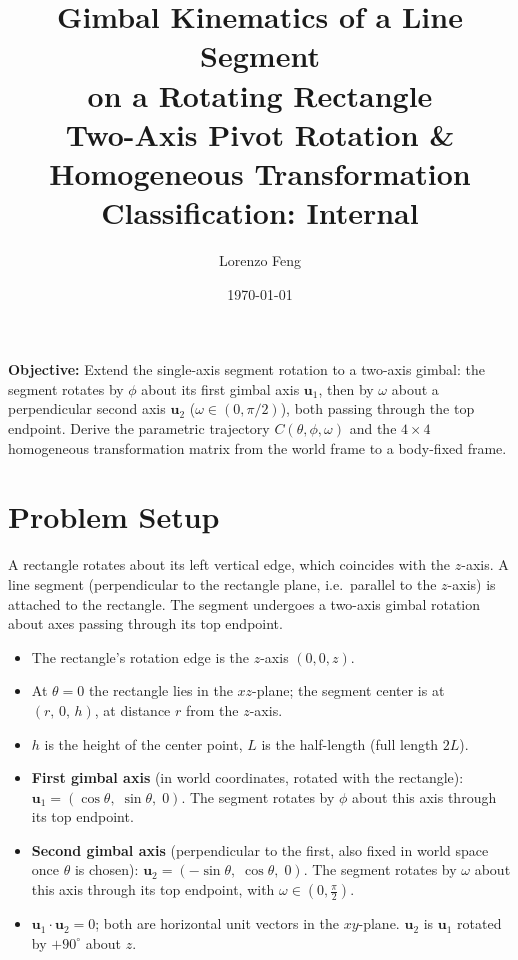 \documentclass[12pt,a4paper]{article}
\title{\Huge\textbf{Gimbal Kinematics of a Line Segment}\\[4pt]
       \Huge\textbf{on a Rotating Rectangle}\\[12pt]
       \large Two-Axis Pivot Rotation \& Homogeneous Transformation\\[8pt]
       \normalsize Classification: Internal}
\author{Lorenzo Feng}
\date{\today}
\newcommand{\uva}{\mathbf{u}_1}
\newcommand{\uvb}{\mathbf{u}_2}
\begin{document}
\maketitle

\vspace{1.5cm}

\begin{center}
\begin{minipage}{0.75\textwidth}
\large
\textbf{Objective:} Extend the single-axis segment rotation to a two-axis
gimbal: the segment rotates by $\phi$ about its first gimbal axis $\uva$, then by
$\omega$ about a perpendicular second axis $\uvb$ ($\omega\in(0,\pi/2)$),
both passing through the top endpoint.
Derive the parametric trajectory $C(\theta,\phi,\omega)$ and the $4\times4$
homogeneous transformation matrix from the world frame to a body-fixed frame.
\end{minipage}
\end{center}

\vfill

\clearpage
\tableofcontents
\clearpage

\section{Problem Setup}

A rectangle rotates about its left vertical edge, which coincides with the $z$-axis.
A line segment (perpendicular to the rectangle plane, i.e.\ parallel to the $z$-axis)
is attached to the rectangle. The segment undergoes a two-axis gimbal rotation about
axes passing through its top endpoint.

\begin{itemize}[leftmargin=*]
  \item The rectangle's rotation edge is the $z$-axis $(0,0,z)$.
  \item At $\theta=0$ the rectangle lies in the $xz$-plane; the segment center is
    at $(r,\,0,\,h)$, at distance $r$ from the $z$-axis.
  \item $h$ is the height of the center point, $L$ is the half-length (full length $2L$).
  \item \textbf{First gimbal axis} (in world coordinates, rotated with the rectangle):
    $\uva = (\cos\theta,\; \sin\theta,\; 0)$.  The segment rotates by $\phi$
    about this axis through its top endpoint.
  \item \textbf{Second gimbal axis} (perpendicular to the first, also fixed in world space
    once $\theta$ is chosen):
    $\uvb = (-\sin\theta,\; \cos\theta,\; 0)$.  The segment rotates by $\omega$
    about this axis through its top endpoint, with $\omega \in (0,\frac{\pi}{2})$.
  \item $\uva \cdot \uvb = 0$; both are horizontal unit vectors in the $xy$-plane.
    $\uvb$ is $\uva$ rotated by $+90^\circ$ about $z$.
\end{itemize}
\end{document}
